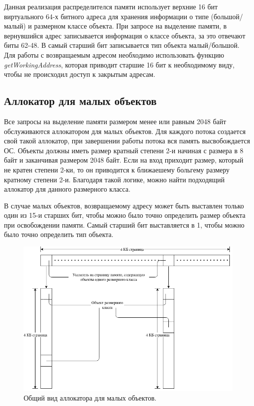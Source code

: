 Данная реализация распределителся памяти использует верхние 16 бит виртуального 64-х битного адреса для хранения информации о типе (большой/малый) и размерном классе объекта. При запросе на выделение памяти, в вернувшийся адрес записывается информация о классе объекта, за это отвечают биты 62-48. В самый старший бит записывается тип объекта малый/большой.\cite{page-tables} Для работы с возвращаемым адресом необходимо использовать функцию \textit{getWorkingAddress}, которая приводит старшие 16 бит к необходимому виду, чтобы не происходил доступ к закрытым адресам.

\subsection{Аллокатор для малых объектов}
Все запросы на выделение памяти размером менее или равным 2048 байт обслуживаются аллокатором для малых объектов. Для каждого потока создается свой такой аллокатор, при завершении работы потока вся память высвобождается ОС. Объекты должны иметь размер кратный степени 2-и начиная с размера в 8 байт и заканчивая размером 2048 байт. Если на вход приходит размер, который не кратен степени 2-ки, то он приводится к ближаешему больгему размеру кратному степени 2-и. Благодаря такой логике, можно найти подходящий аллокатор для данного размерного класса.

В случае малых объектов, возвращаемому адресу может быть выставлен только один из 15-и старших бит, чтобы можно было точно определить размер объекта при освобождении памяти. Самый старший бит выставляется в 1, чтобы можно было точно определить тип объекта.

\begin{figure}[!h]
	\begin{center}
		\includegraphics[scale=0.6]{images/small-allocator-design.png}
		\caption{Общий вид аллокатора для малых объектов.}
		\label{small-allocator-design}
	\end{center}
\end{figure}


